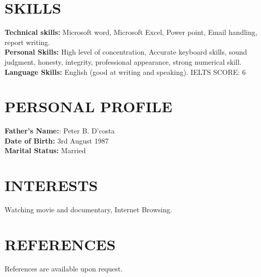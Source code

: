 \documentclass[margin]{res}
\begin{document}
\begin{resume}
\section{SKILLS}

\textbf{Technical skills:} Microsoft word, Microsoft Excel, Power point, Email handling, report writing.
\\
\textbf{Personal Skills:} High level of concentration, Accurate keyboard skills, sound judgment, honesty, integrity, professional appearance, strong numerical skill.
\\
\textbf{Language Skills:} English (good at writing and speaking). IELTS SCORE: 6


\section{PERSONAL PROFILE}
\textbf{Father's Name:}: Peter B. D'costa 
\\
\textbf{Date of Birth:} 3rd August 1987
\\
\textbf{Marital Status:} Married


\section{INTERESTS}
Watching movie and documentary, Internet Browsing.


\section{REFERENCES}
References are available upon request.

\end{resume}
\end{document}
